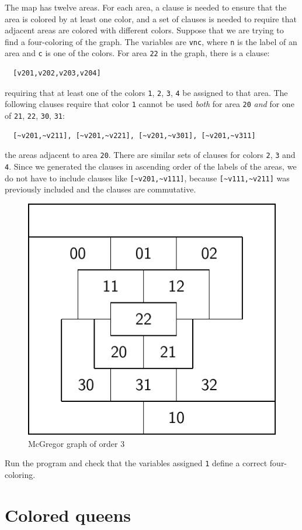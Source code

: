 \documentclass[11pt]{report}
\newcommand*{\p}[1]{\textup{\texttt{#1}}}
\begin{document}
The map has twelve areas. For each area, a clause is needed to ensure that the area is colored by at least one color, and a set of clauses is needed to require that adjacent areas are colored with different colors. Suppose that we are trying to find a four-coloring of the graph. The variables are \p{vnc}, where \p{n} is the label of an area and \p{c} is one of the colors. For area \p{22} in the graph, there is a clause:
\begin{verbatim}
  [v201,v202,v203,v204]
\end{verbatim}
requiring that at least one of the colors \p{1}, \p{2}, \p{3}, \p{4} be assigned to that area. The following clauses require that color \p{1} cannot be used \emph{both} for area \p{20} \emph{and} for one of \p{21}, \p{22}, \p{30}, \p{31}:
\begin{verbatim}
  [~v201,~v211], [~v201,~v221], [~v201,~v301], [~v201,~v311]
\end{verbatim}
the areas adjacent to area \p{20}. There are similar sets of clauses for colors \p{2}, \p{3} and \p{4}. Since we generated the clauses in ascending order of the labels of the areas, we do not have to include clauses like \verb+[~v201,~v111]+, because \verb+[~v111,~v211]+ was previously included and the clauses are commutative.


\begin{figure}
\begin{center}
\includegraphics[width=.4\textwidth]{mcgregor3}
\caption{McGregor graph of order 3}\label{fig.mcgregor}
\end{center}
\end{figure}

Run the program and check that the variables assigned \p{1} define a correct four-coloring.


\section{Colored queens}\label{s.color-queens}
\end{document}
